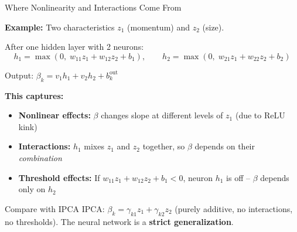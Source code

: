 \documentclass[aspectratio=169]{beamer}
\begin{document}
\begin{frame}{Where Nonlinearity and Interactions Come From}

\textbf{Example:} Two characteristics $z_1$ (momentum) and $z_2$ (size).

\vspace{0.3em}
After one hidden layer with 2 neurons:
\[
h_1 = \max(0,\; w_{11}z_1 + w_{12}z_2 + b_1), \qquad h_2 = \max(0,\; w_{21}z_1 + w_{22}z_2 + b_2)
\]

Output: $\beta_k = v_1 h_1 + v_2 h_2 + b_k^{\text{out}}$

\vspace{0.5em}
\textbf{This captures:}
\begin{itemize}
    \item \textbf{Nonlinear effects:} $\beta$ changes slope at different levels of $z_1$ (due to ReLU kink)
    \item \textbf{Interactions:} $h_1$ mixes $z_1$ and $z_2$ together, so $\beta$ depends on their \emph{combination}
    \item \textbf{Threshold effects:} If $w_{11}z_1 + w_{12}z_2 + b_1 < 0$, neuron $h_1$ is off -- $\beta$ depends only on $h_2$
\end{itemize}

\vspace{0.5em}
\begin{exampleblock}{Compare with IPCA}
IPCA: $\beta_k = \gamma_{k1} z_1 + \gamma_{k2} z_2$ (purely additive, no interactions, no thresholds).
The neural network is a \textbf{strict generalization}.
\end{exampleblock}
\end{frame}
%
%
\end{document}
